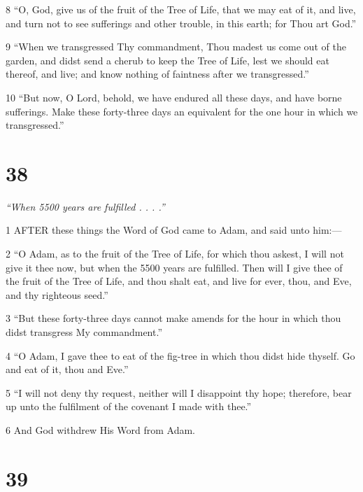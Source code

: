 \par 8 “O, God, give us of the fruit of the Tree of Life, that we may eat of it, and live, and turn not to see sufferings and other trouble, in this earth; for Thou art God.”

\par 9 “When we transgressed Thy commandment, Thou madest us come out of the garden, and didst send a cherub to keep the Tree of Life, lest we should eat thereof, and live; and know nothing of faintness after we transgressed.”

\par 10 “But now, O Lord, behold, we have endured all these days, and have borne sufferings. Make these forty-three days an equivalent for the one hour in which we transgressed.”

\chapter{38}

\par \textit{“When 5500 years are fulfilled . . . .”}

\par 1 AFTER these things the Word of God came to Adam, and said unto him:—

\par 2 “O Adam, as to the fruit of the Tree of Life, for which thou askest, I will not give it thee now, but when the 5500 years are fulfilled. Then will I give thee of the fruit of the Tree of Life, and thou shalt eat, and live for ever, thou, and Eve, and thy righteous seed.”

\par 3 “But these forty-three days cannot make amends for the hour in which thou didst transgress My commandment.”

\par 4 “O Adam, I gave thee to eat of the fig-tree in which thou didst hide thyself. Go and eat of it, thou and Eve.”

\par 5 “I will not deny thy request, neither will I disappoint thy hope; therefore, bear up unto the fulfilment of the covenant I made with thee.”

\par 6 And God withdrew His Word from Adam.

\chapter{39}

